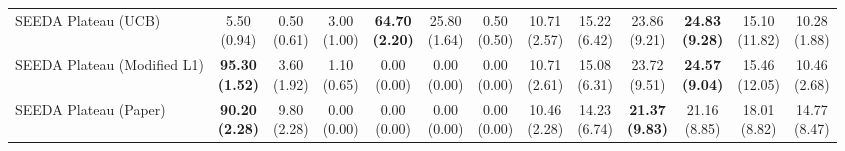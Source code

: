 \begin{table}[H]
{\begin{tabular}{l|cccccc|cccccc}
SEEDA Plateau (UCB) & \makecell{5.50 \\ (0.94)} & \makecell{0.50 \\ (0.61)} & {\cellcolor[HTML]{C8E6C9}} \makecell{3.00 \\ (1.00)} & \bfseries \makecell{64.70 \\ (2.20)} & \makecell{25.80 \\ (1.64)} & \makecell{0.50 \\ (0.50)} & \makecell{10.71 \\ (2.57)} & \makecell{15.22 \\ (6.42)} & {\cellcolor[HTML]{C8E6C9}} \makecell{23.86 \\ (9.21)} & \bfseries \makecell{24.83 \\ (9.28)} & \makecell{15.10 \\ (11.82)} & \makecell{10.28 \\ (1.88)} \\
SEEDA Plateau (Modified L1) & \bfseries \makecell{95.30 \\ (1.52)} & \makecell{3.60 \\ (1.92)} & {\cellcolor[HTML]{C8E6C9}} \makecell{1.10 \\ (0.65)} & \makecell{0.00 \\ (0.00)} & \makecell{0.00 \\ (0.00)} & \makecell{0.00 \\ (0.00)} & \makecell{10.71 \\ (2.61)} & \makecell{15.08 \\ (6.31)} & {\cellcolor[HTML]{C8E6C9}} \makecell{23.72 \\ (9.51)} & \bfseries \makecell{24.57 \\ (9.04)} & \makecell{15.46 \\ (12.05)} & \makecell{10.46 \\ (2.68)} \\
SEEDA Plateau (Paper) & \bfseries \makecell{90.20 \\ (2.28)} & \makecell{9.80 \\ (2.28)} & {\cellcolor[HTML]{C8E6C9}} \makecell{0.00 \\ (0.00)} & \makecell{0.00 \\ (0.00)} & \makecell{0.00 \\ (0.00)} & \makecell{0.00 \\ (0.00)} & \makecell{10.46 \\ (2.28)} & \makecell{14.23 \\ (6.74)} & {\cellcolor[HTML]{C8E6C9}} \bfseries \makecell{21.37 \\ (9.83)} & \makecell{21.16 \\ (8.85)} & \makecell{18.01 \\ (8.82)} & \makecell{14.77 \\ (8.47)} \\
\bottomrule
\end{tabular}
}%
\end{table}
